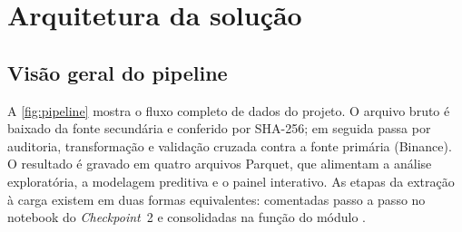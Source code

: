 \chapter{Arquitetura da solução}\label{cap:arquitetura}

\section{Visão geral do pipeline}\label{sec:pipeline}

A \autoref{fig:pipeline} mostra o fluxo completo de dados do projeto. O arquivo
bruto é baixado da fonte secundária e conferido por SHA-256; em seguida passa
por auditoria, transformação e validação cruzada contra a fonte primária
(Binance). O resultado é gravado em quatro arquivos Parquet, que alimentam a
análise exploratória, a modelagem preditiva e o painel interativo. As etapas da
extração à carga existem em duas formas equivalentes: comentadas passo a passo
no notebook do \textit{Checkpoint}~2 e consolidadas na função
 do módulo .

